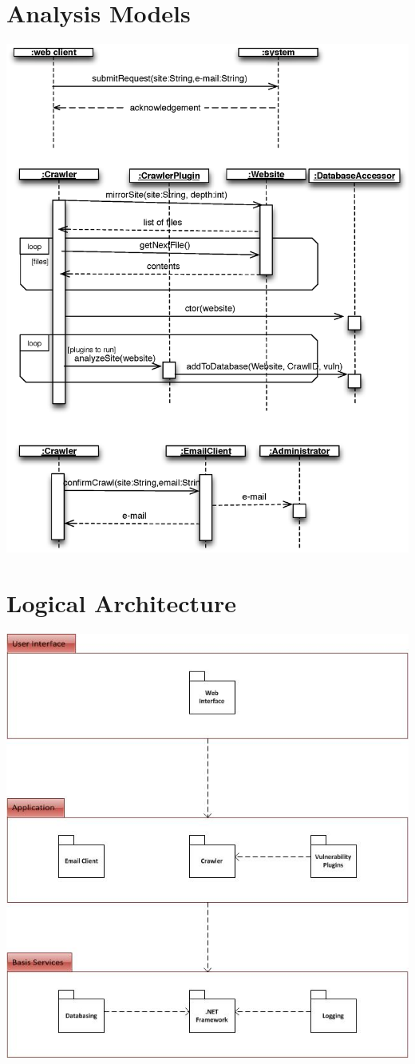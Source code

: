\documentclass{article}
\begin{document}
\section{Analysis Models}
\includegraphics[width=\textwidth]{SeqDia}
\newpage
\section{Logical Architecture}
\includegraphics{LogArch}
\newpage
\end{document}
